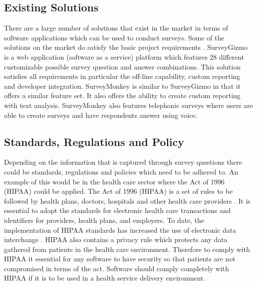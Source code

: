 \documentclass[12pt]{witseiepaper}
\begin{document}
\subsection{Existing Solutions}
There are a large number of solutions that exist in the market in terms of software applications which can be used to conduct surveys. Some of the solutions on the market do satisfy the basic project requirements \cite{ReviewSurvey}. SurveyGizmo \cite{SurveyGizmo} is a web application (software as a service) platform which features 28 different customizable possible survey question and answer combinations. This solution satisfies all requirements in particular the off-line capability, custom reporting and developer integration. SurveyMonkey \cite{SurveyMonkey} is similar to SurveyGizmo in that it offers a similar feature set. It also offers the ability to create custom reporting with text analysis. SurveyMonkey also features telephonic surveys where users are able to create surveys and have respondents answer using voice. 



\subsection{Standards, Regulations and Policy}
Depending on the information that is captured through survey questions there could be standards, regulations and policies which need to be adhered to. An example of this would be in the health care sector where the Act of 1996 (HIPAA) could be applied. The Act of 1996 (HIPAA) is a set of rules to be followed by health plans, doctors, hospitals and other health care providers \cite{HIPAA}. It is essential to adopt the standards for electronic health care transactions and identifiers for providers, health plans, and employers. To date, the implementation of HIPAA standards has increased the use of electronic data interchange \cite{HIPAA}. HIPAA also contains a privacy rule which protects any data gathered from patients in the health care environment. Therefore to comply with HIPAA it essential for any software to have security so that patients are not compromised in terms of the act. Software should comply completely with HIPAA if it is to be used in a health service delivery environment. \\
\end{document}
